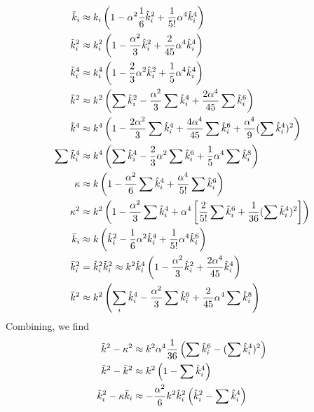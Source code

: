 \documentclass{revtex4}
\begin{document}
\begin{subequations}
\begin{align}
  \tilde{k}_i    &\approx k_i\left(1 - \alpha^2\frac{1}{6}\hat{k}_i^2 + \frac{1}{5!}\alpha^4 \hat{k}_i^4 \right)  \\
  \tilde{k}_i^2  &\approx k_i^2\left(1 -\frac{\alpha^2}{3}\hat{k}_i^2 + \frac{2}{45}\alpha^4\hat{k}_i^4 \right)  \\
  \tilde{k}_i^4  &\approx k_i^4\left(1 - \frac{2}{3}\alpha^2\hat{k}_i^2 + \frac{1}{5}\alpha^4\hat{k}_i^4\right) \\
  \tilde{k}^2    &\approx k^2\left(\sum\hat{k}_i^2 - \frac{\alpha^2}{3}\sum\hat{k}_i^4 + \frac{2\alpha^4}{45}\sum\hat{k}_i^6 \right) \\
  \tilde{k}^4    &\approx k^4\left(1-\frac{2\alpha^2}{3}\sum\hat{k}_i^4 + \frac{4\alpha^4}{45}\sum\hat{k}_i^6 + \frac{\alpha^4}{9}(\sum\hat{k}_i^4)^2\right) \\
  \sum\tilde{k}_i^4 &\approx k^4\left(\sum\hat{k}_i^4 - \frac{2}{3}\alpha^2\sum\hat{k}_i^6 + \frac{1}{5}\alpha^4\sum\hat{k}_i^8\right) \\
  \kappa       &\approx k\left(1 - \frac{\alpha^2}{6}\sum\hat{k}_i^4 + \frac{\alpha^4}{5!}\sum\hat{k}_i^6 \right)   \\
  \kappa^2     &\approx k^2\left(1 - \frac{\alpha^2}{3}\sum\hat{k}_i^4 + \alpha^4\left[\frac{2}{5!}\sum\hat{k}_i^6 + \frac{1}{36}(\sum\hat{k}_i^4)^2\right]\right)  \\
  \bar{k}_i     &\approx k\left(\hat{k}_i^2 - \frac{1}{6}\alpha^2\hat{k}_i^4 + \frac{1}{5!}\alpha^4\hat{k}_i^6\right)   \\
  \bar{k}_i^2   &= \hat{k}_i^2\tilde{k}_i^2 \approx k^2\hat{k}_i^4\left(1-\frac{\alpha^2}{3}\hat{k}_i^2 + \frac{2\alpha^4}{45}\hat{k}_i^4\right)  \\
  \bar{k}^2     &\approx k^2\left(\sum_i\hat{k}_i^4 - \frac{\alpha^2}{3}\sum\hat{k}_i^6 + \frac{2}{45}\alpha^4\sum\hat{k}_i^8 \right)
\end{align}
\end{subequations}
Combining, we find
\begin{subequations}
  \begin{align}
    \tilde{k}^2-\kappa^2 &\approx k^2\alpha^4\frac{1}{36}\left(\sum\hat{k}_i^6 - (\sum\hat{k}_i^4)^2 \right)\\
    \tilde{k}^2-\bar{k}^2 &\approx k^2\left(1-\sum\hat{k}_i^4\right) \\
    \tilde{k}_i^2-\kappa\bar{k}_i &\approx -\frac{\alpha^2}{6}k^2\hat{k}_i^2\left(\hat{k}_i^2-\sum\hat{k}_i^4\right)
  \end{align}
\end{subequations}
\end{document}
